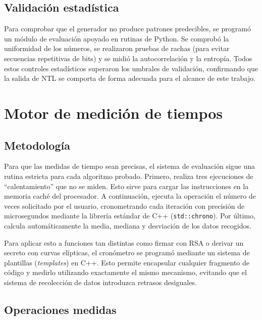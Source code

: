 \subsection{Validación estadística}
\label{subsec:impl-rng-validacion}

Para comprobar que el generador no produce patrones predecibles, se programó un módulo de evaluación apoyado en rutinas de Python. Se comprobó la uniformidad de los números, se realizaron 
pruebas de rachas (para evitar secuencias repetitivas de bits) y se midió la autocorrelación y la entropía. Todos estos controles estadísticos superaron los umbrales de validación, 
confirmando que la salida de NTL se comporta de forma adecuada para el alcance de este trabajo.


\section{Motor de medición de tiempos}
\label{sec:impl-benchmark}

\subsection{Metodología}
\label{subsec:impl-metodologia}

Para que las medidas de tiempo sean precisas, el sistema de evaluación sigue una rutina estricta para cada algoritmo probado. Primero, realiza tres ejecuciones de ``calentamiento'' 
que no se miden. Esto sirve para cargar las instrucciones en la memoria caché del procesador. A continuación, ejecuta la operación el número de veces solicitado por el usuario, 
cronometrando cada iteración con precisión de microsegundos mediante la librería estándar de C++ (\texttt{std::chrono}). Por último, calcula automáticamente la media, mediana y desviación 
de los datos recogidos.

Para aplicar esto a funciones tan distintas como firmar con RSA o derivar un secreto con curvas elípticas, el cronómetro se programó mediante un sistema de plantillas (\textit{templates}) en C++. 
Esto permite encapsular cualquier fragmento de código y medirlo utilizando exactamente el mismo mecanismo, evitando que el sistema de recolección de datos introduzca retrasos desiguales.

\subsection{Operaciones medidas}
\label{subsec:impl-operaciones}

